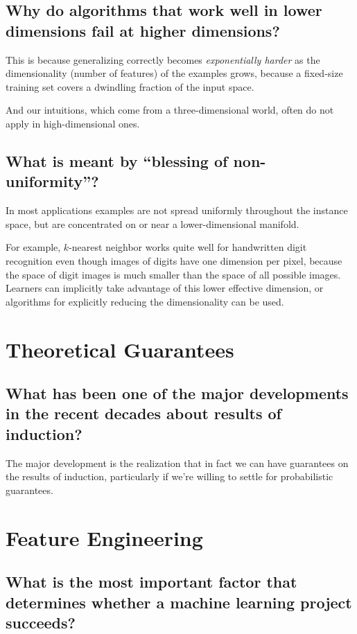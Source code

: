 \documentclass[12pt]{article}
\begin{document}
\subsection{Why do algorithms that work well in lower dimensions fail at higher
dimensions?}

This is because generalizing correctly becomes \emph{exponentially harder} as
the dimensionality (number of features) of the examples grows, because a
fixed-size training set covers a dwindling fraction of the input space.

And our intuitions, which come from a three-dimensional world, often do not
apply in high-dimensional ones.

\subsection{What is meant by ``blessing of non-uniformity''?}

In most applications examples are not spread uniformly throughout the instance
space, but are concentrated on or near a lower-dimensional manifold.

For example, $k$-nearest neighbor works quite well for handwritten digit
recognition even though images of digits have one dimension per pixel, because
the space of digit images is much smaller than the space of all possible
images. Learners can implicitly take advantage of this lower effective
dimension, or algorithms for explicitly reducing the dimensionality can be
used.

\section{Theoretical Guarantees}

\subsection*{What has been one of the major developments in the recent decades
about results of induction?}

The major development is the realization that in fact we can have guarantees on
the results of induction, particularly if we’re willing to settle for
probabilistic guarantees.

\section{Feature Engineering}

\subsection{What is the most important factor that determines whether a machine
learning project succeeds?}
\end{document}
